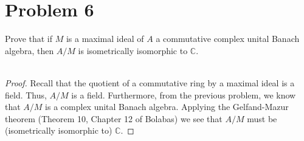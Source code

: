 \documentclass[fontsize=11pt]{scrartcl} %
\numberwithin{equation}{section} %
\numberwithin{figure}{section} %
\numberwithin{table}{section} %
\newcommand{\C}{\mathbb{C}}
\begin{document}
\newpage

\section*{Problem 6}
Prove that if $M$ is a maximal ideal of $A$ a commutative complex unital Banach
algebra, then $A/M$ is isometrically isomorphic to $\C$.
\\
\\
\begin{proof}
    Recall that the quotient of a commutative ring by a maximal ideal is a
    field. Thus, $A/{M}$ is a field. Furthermore, from the previous problem, we
    know that $A/{M}$ is a complex unital Banach algebra. Applying the
    Gelfand-Mazur theorem (Theorem 10, Chapter 12 of Bolabas) we see that
    $A/{M}$ must be (isometrically isomorphic to) $\C$.
\end{proof}
\end{document}
